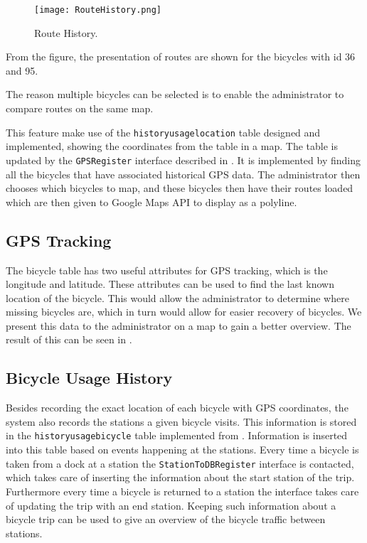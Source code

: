 \begin{figure}[H]
	\centering
	\texttt{[image: RouteHistory.png]}
	\caption{Route History.}
	\label{fig:routehistory}
\end{figure}

From the figure, the presentation of routes are shown for the bicycles with id 36 and 95.

The reason multiple bicycles can be selected is to enable the administrator to compare routes on the same map.

This feature make use of the \texttt{historyusagelocation} table designed and implemented, showing the coordinates from the table in a map.
The table is updated by the \texttt{GPSRegister} interface described in .
It is implemented by finding all the bicycles that have associated historical GPS data.
The administrator then chooses which bicycles to map, and these bicycles then have their routes loaded which are then given to Google Maps API to display as a polyline.

\subsection{GPS Tracking}\label{sec:gpsHistory}
The bicycle table has two useful attributes for GPS tracking, which is the longitude and latitude.
These attributes can be used to find the last known location of the bicycle. 
This would allow the administrator to determine where missing bicycles are, which in turn would allow for easier recovery of bicycles.
We present this data to the administrator on a map to gain a better overview.
The result of this can be seen in .

\subsection{Bicycle Usage History}\label{sec:bicycleUsageHistory}

Besides recording the exact location of each bicycle with GPS coordinates, the system also records the stations a given bicycle visits.
This information is stored in the \texttt{historyusage\-bicycle} table implemented from .
Information is inserted into this table based on events happening at the stations. 
Every time a bicycle is taken from a dock at a station the \texttt{StationTo\-DBRegister} interface is contacted, which takes care of inserting the information about the start station of the trip.
Furthermore every time a bicycle is returned to a station the interface takes care of updating the trip with an end station.
Keeping such information about a bicycle trip can be used to give an overview of the bicycle traffic between stations.

